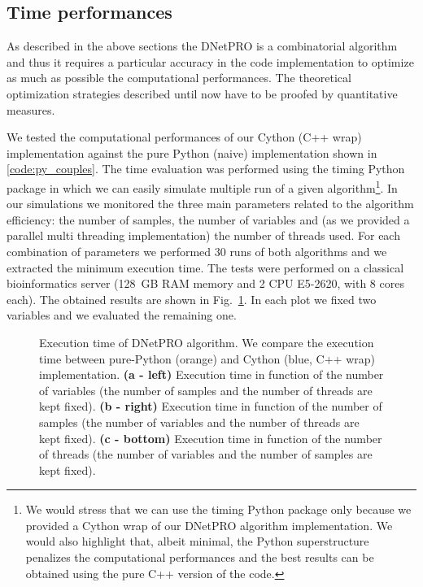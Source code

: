 \documentclass{standalone}
\begin{document}
\subsection[Time performances]{Time performances}\label{implementation:timing}

As described in the above sections the DNetPRO is a combinatorial algorithm and thus it requires a particular accuracy in the code implementation to optimize as much as possible the computational performances.
The theoretical optimization strategies described until now have to be proofed by quantitative measures.

We tested the computational performances of our Cython (C++ wrap) implementation against the pure Python (naive) implementation shown in \ref{code:py_couples}.
The time evaluation was performed using the \textsf{timing} Python package in which we can easily simulate multiple run of a given algorithm\footnote{
  We would stress that we can use the \textsf{timing} Python package only because we provided a Cython wrap of our DNetPRO algorithm implementation.
  We would also highlight that, albeit minimal, the Python superstructure penalizes the computational performances and the best results can be obtained using the pure C++ version of the code.
}.
In our simulations we monitored the three main parameters related to the algorithm efficiency: the number of samples, the number of variables and (as we provided a parallel multi threading implementation) the number of threads used.
For each combination of parameters we performed 30 runs of both algorithms and we extracted the minimum execution time.
The tests were performed on a classical bioinformatics server (128~GB RAM memory and 2 CPU E5-2620, with 8 cores each).
The obtained results are shown in Fig.~\ref{fig:dnetpro_timing}.
In each plot we fixed two variables and we evaluated the remaining one.

\begin{figure}[htbp]
\hspace{-1.0cm}
\def\svgwidth{0.45\textwidth}

\qquad
\hspace{1.0cm}
\def\svgwidth{0.45\textwidth}

\qquad\qquad
\centering
\def\svgwidth{0.7\textwidth}

\caption{Execution time of DNetPRO algorithm.
We compare the execution time between pure-Python (orange) and Cython (blue, C++ wrap) implementation.
\textbf{(a - left)} Execution time in function of the number of variables (the number of samples and the number of threads are kept fixed).
\textbf{(b - right)} Execution time in function of the number of samples (the number of variables and the number of threads are kept fixed).
\textbf{(c - bottom)} Execution time in function of the number of threads (the number of variables and the number of samples are kept fixed).
}
\label{fig:dnetpro_timing}
\end{figure}
\end{document}
